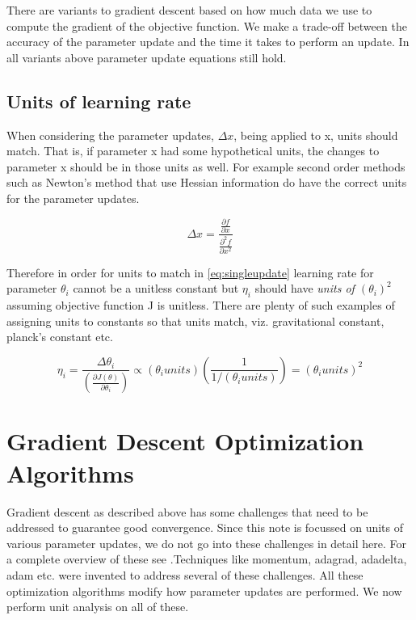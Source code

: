 \documentclass{article}
\begin{document}
	 There are variants to gradient descent based on how much data we use to compute the gradient of the objective function. We make a trade-off between
	 the accuracy of the parameter update and the time it takes to perform an update. In all variants above parameter update equations still hold.
	 
\subsection{Units of learning rate}
	
	When considering the parameter updates, $\Delta x$, being applied to x, units should match. That is, if parameter x had some hypothetical units, the changes to parameter x should be in those units as well. For example second order methods such as Newton’s method that use Hessian information do have the correct units for the parameter updates. 
	
	\begin{center} \begin{equation}	\Delta x =  \frac {\frac{\partial f}{\partial x}} {\frac{\partial^{2} f}{\partial x^{2}}}	\label{eq:newton} \end{equation} \end{center}
	
	Therefore in order for units to match in \ref{eq:singleupdate} learning rate for parameter $\theta_{i}$ cannot be a unitless constant but $\eta_{i}$ should have {\itshape units of $(\theta_{i})^{2}$} assuming objective function J is unitless. There are plenty of such examples of assigning units to constants so that units match, viz. gravitational constant, planck's constant etc.
	
	\begin{center} \begin{equation} \eta_{i} = \frac {\Delta \theta_{i}} {(\frac{\partial J(\theta)}{\partial \theta_{i}})} \propto (\theta_{i} units)(\frac{1}{1/(\theta_{i} units)}) = (\theta_{i} units)^{2} \label{eq:etaunits} \end{equation} \end{center}
	
	 
\section{Gradient Descent Optimization Algorithms}
	Gradient descent as described above has some challenges that need to be addressed to guarantee good convergence. Since this note is focussed on units of various parameter updates, we do not go into these challenges in detail here. For a complete overview of these see \cite{DBLP:journals/corr/Ruder16}.Techniques like momentum, adagrad, adadelta, adam etc. were invented to address several of these challenges. All these optimization algorithms modify how parameter updates are performed. We now perform unit analysis on all of these.
	
\end{document}
